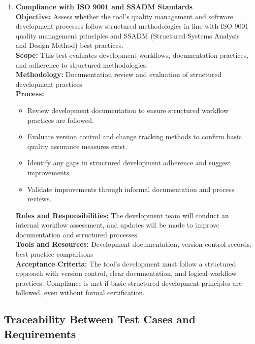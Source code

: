 \documentclass[12pt, titlepage]{article}
\begin{document}
\begin{enumerate}[label={\bf
      \textcolor{Maroon}{test-CPL-\arabic*}}, wide=0pt, font=\itshape]
    \item \textbf{Compliance with ISO 9001 and SSADM Standards} \\[2mm]
      \textbf{Objective:} Assess whether the tool’s quality
      management and software development processes follow structured
      methodologies in line with ISO 9001 quality management
      principles and SSADM (Structured Systems Analysis and Design
      Method) best practices. \\[2mm]
      \textbf{Scope:} This test evaluates development workflows,
      documentation practices, and adherence to structured
      methodologies. \\[2mm]
      \textbf{Methodology:} Documentation review and evaluation of
      structured development practices \\[2mm]
      \textbf{Process:}
      \begin{itemize}
        \item Review development documentation to ensure structured
          workflow practices are followed.
        \item Evaluate version control and change tracking methods to
          confirm basic quality assurance measures exist.
        \item Identify any gaps in structured development adherence
          and suggest improvements.
        \item Validate improvements through informal documentation
          and process reviews.
      \end{itemize}
      \textbf{Roles and Responsibilities:} The development team will
      conduct an internal workflow assessment, and updates will be
      made to improve documentation and structured processes. \\[2mm]
      \textbf{Tools and Resources:} Development documentation,
      version control records, best practice comparisons \\[2mm]
      \textbf{Acceptance Criteria:} The tool's development must
      follow a structured approach with version control, clear
      documentation, and logical workflow practices. Compliance is
      met if basic structured development principles are followed,
      even without formal certification.
  \end{enumerate}

\subsection{Traceability Between Test Cases and Requirements}
\label{trace-sys}
\end{document}

